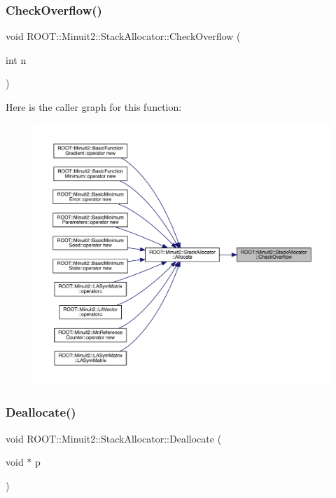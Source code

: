 \subsubsection{\texorpdfstring{CheckOverflow()}{CheckOverflow()}\hspace{0.1cm}{\footnotesize\ttfamily [2/2]}}
{\footnotesize\ttfamily void R\+O\+O\+T\+::\+Minuit2\+::\+Stack\+Allocator\+::\+Check\+Overflow (\begin{DoxyParamCaption}\item[{int}]{n }\end{DoxyParamCaption})\hspace{0.3cm}{\ttfamily [inline]}}

Here is the caller graph for this function\+:\nopagebreak
\begin{figure}[H]
\begin{center}
\leavevmode
\includegraphics[width=350pt]{d3/d1e/classROOT_1_1Minuit2_1_1StackAllocator_a96a7565f7b4bb269f740901eef54a97e_icgraph}
\end{center}
\end{figure}
\mbox{\label{classROOT_1_1Minuit2_1_1StackAllocator_ac36426e01e1474491cef1b203dba2f0c}} 
\subsubsection{\texorpdfstring{Deallocate()}{Deallocate()}\hspace{0.1cm}{\footnotesize\ttfamily [1/2]}}
{\footnotesize\ttfamily void R\+O\+O\+T\+::\+Minuit2\+::\+Stack\+Allocator\+::\+Deallocate (\begin{DoxyParamCaption}\item[{void $\ast$}]{p }\end{DoxyParamCaption})\hspace{0.3cm}{\ttfamily [inline]}}


